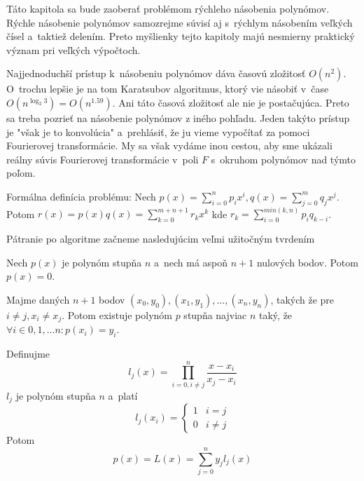 Táto kapitola sa bude zaoberať problémom rýchleho násobenia polynómov.
Rýchle násobenie polynómov samozrejme súvisí aj s~rýchlym násobením
veľkých čísel a~taktiež delením. Preto myšlienky tejto kapitoly majú
 nesmierny praktický význam pri veľkých výpočtoch.


Najjednoduchší prístup k~násobeniu polynómov dáva časovú zložitosť
$O(n^2)$. O~trochu lepšie je na tom Karatsubov algoritmus, ktorý vie
násobiť v~čase $O(n^{\log_{2}3})=O(n^{1.59})$. Ani táto časová
zložitosť ale nie je postačujúca. Preto sa treba pozrieť na násobenie
polynómov z iného pohľadu. Jeden takýto prístup je "však je to konvolúcia"
a~prehlásiť, že ju vieme vypočítať za pomoci Fourierovej
transformácie. My sa však vydáme inou cestou, aby sme ukázali reálny
súvis Fourierovej transformácie v~poli $F$ s~okruhom polynómov nad
týmto poľom.

Formálna definícia problému:
Nech $p(x)=\sum_{i=0}^{n} p_i x^i, q(x) = \sum_{j=0}^{m} q_j x^j$.
Potom $r(x) = p(x) q(x) = \sum_{k=0}^{m+n+1} r_k x^k$ kde
$r_k = \sum_{i=0}^{min(k,n)} p_i q_{k-i}$.

Pátranie po algoritme začneme nasledujúcim veľmi užitočným tvrdením
\begin{lema}
 Nech $p(x)$ je polynóm stupňa $n$ a~nech má aspoň $n+1$ nulových
 bodov. Potom $p(x)=0$.
 \label{lema:zero_poly}
\end{lema}

\begin{lema}[O~interpolácii]
 Majme daných $n+1$ bodov $(x_0,y_0), (x_1,y_1), \dots, (x_n,y_n)$,
 takých že pre $i\not=j, x_i\not=x_j$.
 Potom existuje polynóm $p$ stupňa najviac $n$ taký, že
 $\forall i\in 0,1,\dots n: p(x_i)=y_i$.
\label{lema:interpolacia}
\end{lema}
\begin{dokaz}
 Definujme 
 \begin{equation*}
    l_j(x) = \prod_{i=0,i\not=j}^{n} \frac{x-x_i}{x_j-x_i}
 \end{equation*}
 $l_j$ je polynóm stupňa $n$ a~platí 
 \begin{equation*}
    l_j(x_i) = \left\{
            \begin{array}{ll}
                1&i=j\\
                0&i\not=j
            \end{array}
            \right.
 \end{equation*}
 Potom 
 \begin{equation}
 p(x) = L(x) = \displaystyle \sum_{j=0}^{n} y_j l_j(x)
   \label{eq:lagrange_interpolation}
 \end{equation}
\end{dokaz}

